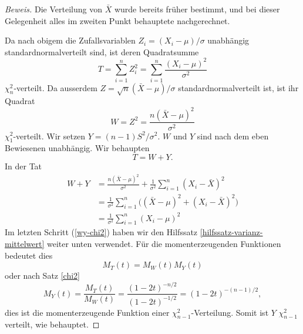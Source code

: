 \begin{proof}[Beweis]
Die Verteilung von $\bar X$ wurde bereits früher bestimmt, und bei
dieser Gelegenheit alles im zweiten Punkt behauptete nachgerechnet.

Da nach obigem die Zufallsvariablen $Z_i=(X_i-\mu)/\sigma$ unabhängig
standardnormalverteilt sind, ist deren Quadratsumme
\begin{equation}
T=\sum_{i=1}^nZ_i^2=\sum_{i=1}^n\frac{(X_i-\mu)^2}{\sigma^2}
\end{equation}
$\chi^2_{n}$-verteilt.
Da ausserdem $Z=\sqrt{n}(\bar X-\mu)/\sigma$ standardnormalverteilt
ist, ist ihr Quadrat
\begin{equation}
W=Z^2=\frac{n(\bar X-\mu)^2}{\sigma^2}
\end{equation}
$\chi^2_1$-verteilt.
Wir setzen $Y=(n-1)S^2/\sigma^2$.
$W$ und $Y$ sind nach dem eben Bewiesenen unabhängig.
Wir behaupten
\[
T=W+Y.
\]
In der Tat 
\begin{align}
W+Y
&=
\frac{n(\bar X-\mu)^2}{\sigma^2}
+
\frac{1}{\sigma^2}\sum_{i=1}^n(X_i-\bar X)^2
\nonumber\\
&=
\frac{1}{\sigma^2}\sum_{i=1}^n\bigl((\bar X-\mu)^2+(X_i-\bar X)^2\bigr)
\nonumber\\
&=
\frac{1}{\sigma^2}\sum_{i=1}^n(X_i-\mu)^2
\label{wy-chi2}
\end{align}
Im letzten Schritt (\ref{wy-chi2}) haben wir den Hilfssatz
\ref{hilfssatz-varianz-mittelwert}
weiter unten verwendet.
Für die momenterzeugenden Funktionen bedeutet dies
\begin{equation}
M_T(t)=M_W(t)M_Y(t)
\end{equation}
oder nach Satz \ref{chi2}
\begin{equation}
M_Y(t)=\frac{M_T(t)}{M_W(t)}=\frac{(1-2t)^{-n/2}}{(1-2t)^{-1/2}}
=(1-2t)^{-(n-1)/2},
\end{equation}
dies ist die momenterzeugende Funktion einer $\chi^2_{n-1}$-Verteilung.
Somit ist $Y$ $\chi_{n-1}^2$ verteilt, wie behauptet.
\end{proof}


